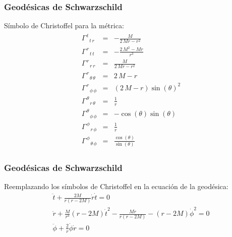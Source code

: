 \documentclass{beamer}
\begin{document}


\begin{frame}
\frametitle{Geodésicas de Schwarzschild}
Símbolo de Christoffel para la métrica: 
\begin{gather*}
\begin{array}{lcl} \Gamma_{ \phantom{\, t} \, t \, r }^{ \, t \phantom{\, t} \phantom{\, r} } & = & -\frac{M}{2 \, M r - r^{2}} \\ \Gamma_{ \phantom{\, r} \, t \, t }^{ \, r \phantom{\, t} \phantom{\, t} } & = & -\frac{2 \, M^{2} - M r}{r^{3}} \\ \Gamma_{ \phantom{\, r} \, r \, r }^{ \, r \phantom{\, r} \phantom{\, r} } & = & \frac{M}{2 \, M r - r^{2}} \\ \Gamma_{ \phantom{\, r} \, {\theta} \, {\theta} }^{ \, r \phantom{\, {\theta}} \phantom{\, {\theta}} } & = & 2 \, M - r \\ \Gamma_{ \phantom{\, r} \, {\phi} \, {\phi} }^{ \, r \phantom{\, {\phi}} \phantom{\, {\phi}} } & = & {\left(2 \, M - r\right)} \sin\left({\theta}\right)^{2} \\ \Gamma_{ \phantom{\, {\theta}} \, r \, {\theta} }^{ \, {\theta} \phantom{\, r} \phantom{\, {\theta}} } & = & \frac{1}{r} \\ \Gamma_{ \phantom{\, {\theta}} \, {\phi} \, {\phi} }^{ \, {\theta} \phantom{\, {\phi}} \phantom{\, {\phi}} } & = & -\cos\left({\theta}\right) \sin\left({\theta}\right) \\ \Gamma_{ \phantom{\, {\phi}} \, r \, {\phi} }^{ \, {\phi} \phantom{\, r} \phantom{\, {\phi}} } & = & \frac{1}{r} \\ \Gamma_{ \phantom{\, {\phi}} \, {\theta} \, {\phi} }^{ \, {\phi} \phantom{\, {\theta}} \phantom{\, {\phi}} } & = & \frac{\cos\left({\theta}\right)}{\sin\left({\theta}\right)} \end{array}
\end{gather*}
\end{frame}




\begin{frame}
\frametitle{Geodésicas de Schwarzschild}

Reemplazando los símbolos de Christoffel en la ecuación de la geodésica: 
\begin{gather*}
  \ddot t + \frac{2M}{r(r-2M)}\dot r \dot t = 0\\
  \ddot r + \frac{M}{r^3}(r-2M)\dot t^2 - \frac{M\dot r}{r(r-2M)}-(r-2M)\dot \phi^2=0 \\
  \ddot \phi + \frac{2}{r} \dot \phi \dot r = 0 
\end{gather*}
\end{frame}
\end{document}
